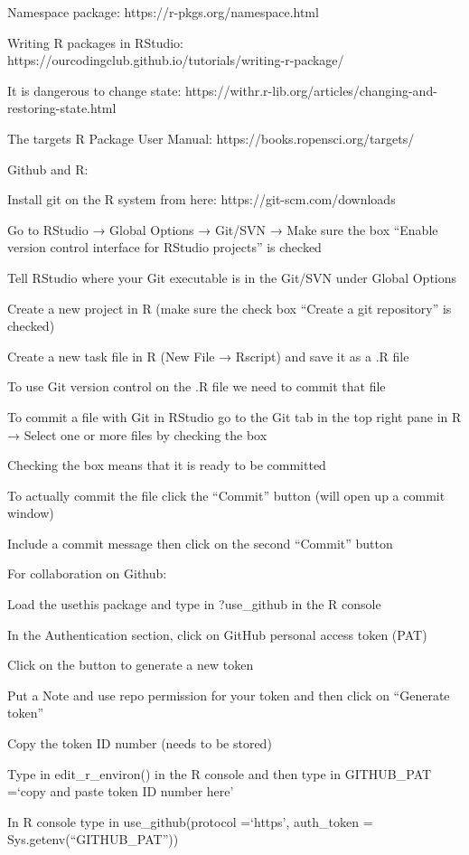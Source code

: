 \documentclass[
  letterpaper,
  DIV=11,
  numbers=noendperiod]{scrreport}
\begin{document}
Namespace package: https://r-pkgs.org/namespace.html

Writing R packages in RStudio:
https://ourcodingclub.github.io/tutorials/writing-r-package/

It is dangerous to change state:
https://withr.r-lib.org/articles/changing-and-restoring-state.html

The targets R Package User Manual: https://books.ropensci.org/targets/

Github and R:

Install git on the R system from here: https://git-scm.com/downloads

Go to RStudio → Global Options → Git/SVN → Make sure the box ``Enable
version control interface for RStudio projects'' is checked

Tell RStudio where your Git executable is in the Git/SVN under Global
Options

Create a new project in R (make sure the check box ``Create a git
repository'' is checked)

Create a new task file in R (New File → Rscript) and save it as a .R
file

To use Git version control on the .R file we need to commit that file

To commit a file with Git in RStudio go to the Git tab in the top right
pane in R → Select one or more files by checking the box

Checking the box means that it is ready to be committed

To actually commit the file click the ``Commit'' button (will open up a
commit window)

Include a commit message then click on the second ``Commit'' button

For collaboration on Github:

Load the usethis package and type in ?use\_github in the R console

In the Authentication section, click on GitHub personal access token
(PAT)

Click on the button to generate a new token

Put a Note and use repo permission for your token and then click on
``Generate token''

Copy the token ID number (needs to be stored)

Type in edit\_r\_environ() in the R console and then type in GITHUB\_PAT
=`copy and paste token ID number here'

In R console type in use\_github(protocol =`https', auth\_token =
Sys.getenv(``GITHUB\_PAT''))
\end{document}
